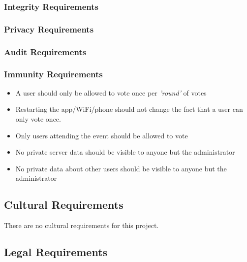 \documentclass[12pt, titlepage]{article}
\begin{document}
\subsubsection{Integrity Requirements}
\subsubsection{Privacy Requirements}
\subsubsection{Audit Requirements}
\subsubsection{Immunity Requirements}
\begin{itemize}
\item A user should only be allowed to vote once per \textit{'round'} of votes
\item Restarting the app/WiFi/phone should not change the fact that a user can
only vote once.
\item Only users attending the event should be allowed to vote
\item No private server data should be visible to anyone but the administrator
\item No private data about other users should be visible to anyone but the
administrator
\end{itemize}

\subsection{Cultural Requirements}
There are no cultural requirements for this project.
\subsection{Legal Requirements}
\end{document}

